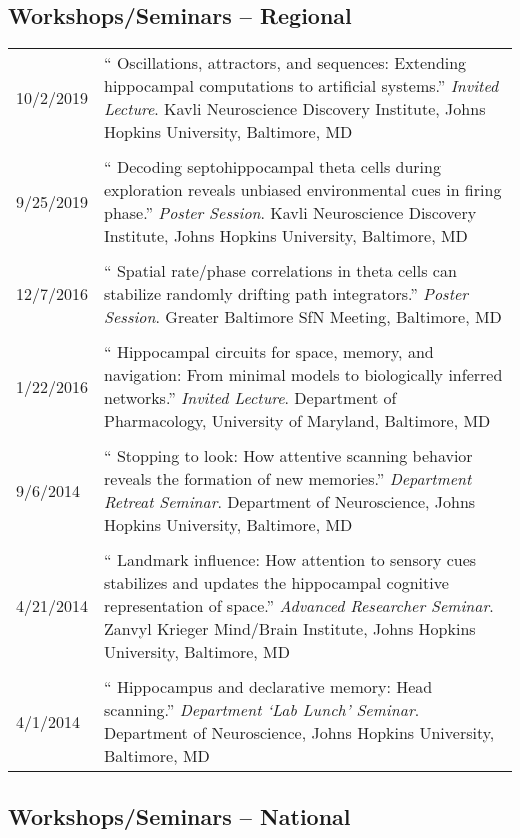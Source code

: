 \documentclass[10pt]{article}
\newcommand{\unpubtitle}[1]{{\color{hopkinsblue} #1}}
\begin{document}
\subsection*{Workshops/Seminars -- Regional}

\begin{longtable}{@{\hspace{0.2in}}l>{\raggedright\arraybackslash}p{}}
  10/2/2019 \hspace{0.1in} & ``\unpubtitle{Oscillations, attractors, and
  sequences: Extending hippocampal computations to artificial systems}.''
  \emph{Invited Lecture}. Kavli Neuroscience Discovery Institute, Johns Hopkins
  University, Baltimore, MD\\
  \tabularnewline
  9/25/2019 & ``\unpubtitle{Decoding septohippocampal theta cells during
  exploration reveals unbiased environmental cues in firing phase}.''
  \emph{Poster Session}. Kavli Neuroscience Discovery Institute, Johns Hopkins
  University, Baltimore, MD\\
  \tabularnewline
  12/7/2016 & ``\unpubtitle{Spatial rate/phase correlations in theta cells
  can stabilize randomly drifting path integrators}.'' \emph{Poster Session}.
  Greater Baltimore SfN Meeting, Baltimore, MD\\
  \tabularnewline
  1/22/2016 & ``\unpubtitle{Hippocampal circuits for space, memory, and
  navigation: From minimal models to biologically inferred networks}.''
  \emph{Invited Lecture}. Department of Pharmacology, University of Maryland,
  Baltimore, MD\\
  \tabularnewline
  9/6/2014 & ``\unpubtitle{Stopping to look: How attentive scanning behavior
  reveals the formation of new memories}.'' \emph{Department Retreat Seminar}.
  Department of Neuroscience, Johns Hopkins University, Baltimore, MD\\
  \tabularnewline
  4/21/2014 & ``\unpubtitle{Landmark influence: How attention to sensory cues
  stabilizes and updates the hippocampal cognitive representation of space}.''
  \emph{Advanced Researcher Seminar}. Zanvyl Krieger Mind/Brain Institute, Johns
  Hopkins University, Baltimore, MD\\
  \tabularnewline
  4/1/2014 & ``\unpubtitle{Hippocampus and declarative memory:
  Head scanning}.'' \emph{Department `Lab Lunch' Seminar}. Department of
  Neuroscience, Johns Hopkins University, Baltimore, MD\\
\end{longtable}

\subsection*{Workshops/Seminars -- National}
\end{document}
